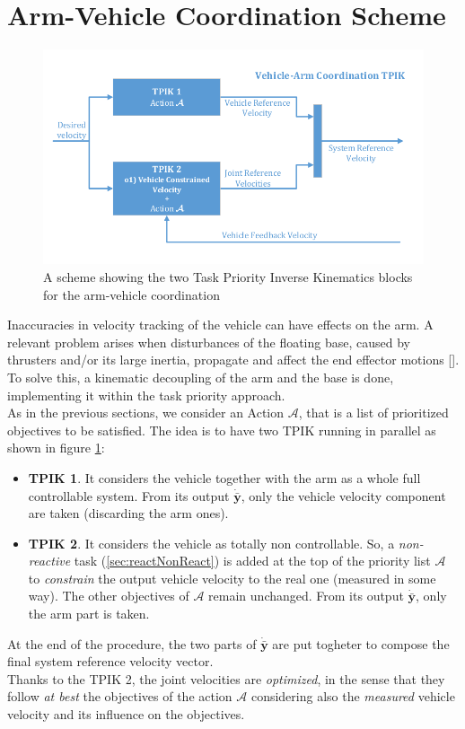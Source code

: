 \section{Arm-Vehicle Coordination Scheme}
\label{sec:armVehScheme}
\begin{figure}[H]
	\begin{center}
		\includegraphics[width=0.90\columnwidth]{vehArmCoordScheme}
		\caption[Arm-Vehicle Coordination Scheme in the TPIK]{A scheme showing the two Task Priority Inverse Kinematics blocks for the arm-vehicle coordination}\label{fig:veharmcoord}
	\end{center}
\end{figure}
Inaccuracies in velocity tracking of the vehicle can have effects on the arm. 
A relevant problem arises when disturbances of the floating base, caused by thrusters and/or its large inertia, propagate and affect the end effector motions [\cite{IntroMaris2}].
To solve this, a kinematic decoupling of the arm and the base is done, implementing it within the task priority approach.\\
As in the previous sections, we consider an Action $\mathcal{A}$, that is a list of prioritized objectives to be satisfied.
The idea is to have two TPIK running in parallel as shown in figure \ref{fig:veharmcoord}:
\begin{itemize}
	\item \textbf{TPIK 1}. It considers the vehicle together with the arm as a whole full controllable system. From its output $\dot{\bar{\boldsymbol{y}}}$, only the vehicle velocity component are taken (discarding the arm ones).
	\item \textbf{TPIK 2}. It considers the vehicle as totally non controllable. So, a \textit{non-reactive} task (\ref{sec:reactNonReact}) is added at the top of the priority list $\mathcal{A}$ to \textit{constrain} the output vehicle velocity to the real one (measured in some way). The other objectives of $\mathcal{A}$ remain unchanged. From its output $\dot{\bar{\boldsymbol{y}}}$, only the arm part is taken.
\end{itemize}
At the end of the procedure, the two parts of $\dot{\bar{\boldsymbol{y}}}$ are put togheter to compose the final system reference velocity vector.\\
Thanks to the TPIK 2, the joint velocities are \textit{optimized}, in the sense that they follow \textit{at best} the objectives of the action $\mathcal{A}$ considering also the \textit{measured} vehicle velocity and its influence on the objectives.	

